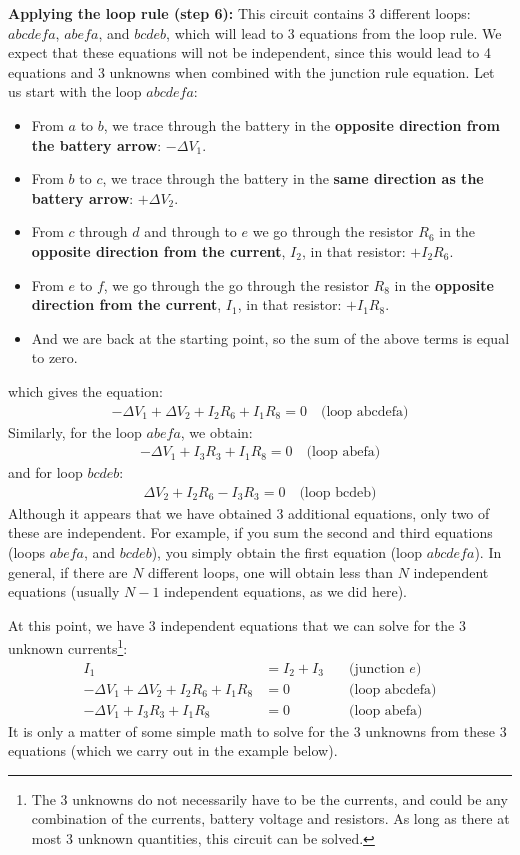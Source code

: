 \textbf{Applying the loop rule (step 6): } This circuit contains 3 different loops: $abcdefa$, $abefa$, and $bcdeb$, which will lead to 3 equations from the loop rule. We expect that these equations will not be independent, since this would lead to 4 equations and 3 unknowns when combined with the junction rule equation. Let us start with the loop $abcdefa$:
\begin{itemize}
\item From $a$ to $b$, we trace through the battery in the \textbf{opposite direction from the battery arrow}: $-\Delta V_1$.
\item From $b$ to $c$, we trace through the battery in the \textbf{same direction as the battery arrow}: $+\Delta V_2$.
\item From $c$ through $d$ and through to $e$ we go through the resistor $R_6$ in the \textbf{opposite direction from the current}, $I_2$, in that resistor: $+I_2R_6$.
\item From $e$ to $f$, we go through the go through the resistor $R_8$ in the \textbf{opposite direction from the current}, $I_1$, in that resistor: $+I_1R_8$.
\item And we are back at the starting point, so the sum of the above terms is equal to zero.
\end{itemize}
which gives the equation:
\begin{align*}
-\Delta V_1+\Delta V_2+I_2R_6+I_1R_8=0\quad\text{(loop abcdefa)}
\end{align*}
Similarly, for the loop $abefa$, we obtain:
\begin{align*}
-\Delta V_1+I_3R_3+I_1R_8=0\quad\text{(loop abefa)}
\end{align*}
and for loop $bcdeb$:
\begin{align*}
\Delta V_2+I_2R_6-I_3R_3=0\quad\text{(loop bcdeb)}
\end{align*}
Although it appears that we have obtained 3 additional equations, only two of these are independent. For example, if you sum the second and third equations (loops $abefa$, and $bcdeb$), you simply obtain the first equation (loop $abcdefa$). In general, if there are $N$ different loops, one will obtain less than $N$ independent equations (usually $N-1$ independent equations, as we did here).

At this point, we have 3 independent equations that we can solve for the 3 unknown currents\footnote{The 3 unknowns do not necessarily have to be the currents, and could be any combination of the currents, battery voltage and resistors. As long as there at most 3 unknown quantities, this circuit can be solved.}:
\begin{align*}
I_1 &= I_2+I_3 \quad &\text{(junction $e$)}\\
-\Delta V_1+\Delta V_2+I_2R_6+I_1R_8&=0\quad&\text{(loop abcdefa)}\\
-\Delta V_1+I_3R_3+I_1R_8&=0\quad&\text{(loop abefa)}
\end{align*}
It is only a matter of some simple math to solve for the 3 unknowns from these 3 equations (which we carry out in the example below). 

